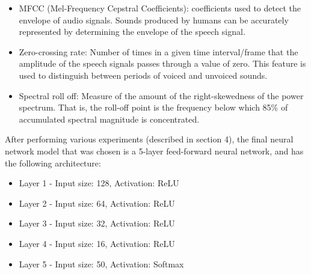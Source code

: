 \documentclass[10pt,twocolumn,letterpaper]{article}
\begin{document}
\begin{itemize}
   \item MFCC (Mel-Frequency Cepstral Coefficients): coefficients used to detect the envelope of audio signals. Sounds produced by humans can be accurately represented by determining the envelope of the speech signal.
   \item Zero-crossing rate: Number of times in a given time interval/frame that the amplitude of the speech signals passes through a value of zero. This feature is used to distinguish between periods of voiced and unvoiced sounds.
   \item Spectral roll off: Measure of the amount of the right-skewedness of the power spectrum. That is, the roll-off point is the frequency below which 85\% of accumulated spectral magnitude is concentrated.
\end{itemize}

After performing various experiments (described in section 4), the final neural network model that was chosen is a 5-layer feed-forward neural network, and has the following architecture:

\begin{itemize}[itemsep=-5pt]
    \item Layer 1 - Input size: 128, Activation: ReLU
    \item Layer 2 - Input size: 64, Activation: ReLU
    \item Layer 3 - Input size: 32, Activation: ReLU
    \item Layer 4 - Input size: 16, Activation: ReLU
    \item Layer 5 - Input size: 50, Activation: Softmax
\end{itemize}
\end{document}
